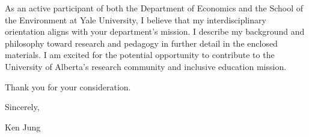 \documentclass[11pt,letterpaper]{article}
\begin{document}
As an active participant of both the Department of Economics and the School of the Environment at Yale University, I believe that my interdisciplinary orientation aligns with your department's mission. I describe my background and philosophy toward research and pedagogy in further detail in the enclosed materials. I am excited for the potential opportunity to contribute to the University of Alberta's research community and inclusive education mission.

Thank you for your consideration.

Sincerely,

Ken Jung
\end{document}
